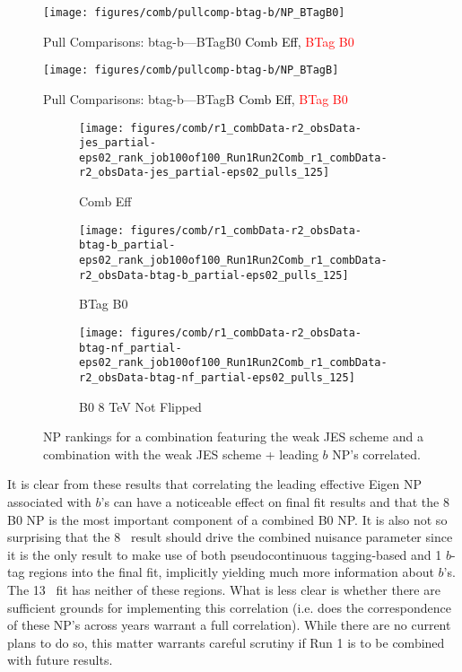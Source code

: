 \begin{figure}[!htbp]\captionsetup{justification=centering}
\centering\texttt{[image: figures/comb/pullcomp-btag-b/NP\_BTagB0]}
  \caption{Pull Comparisons: btag-b---BTagB0  \textcolor{black}{Comb Eff}, \textcolor{red}{BTag B0}}
  \label{fig:PullComparisons:btag-b---BTagB0}
\end{figure}

\begin{figure}[!htbp]\captionsetup{justification=centering}
\centering\texttt{[image: figures/comb/pullcomp-btag-b/NP\_BTagB]}
  \caption{Pull Comparisons: btag-b---BTagB  \textcolor{black}{Comb Eff}, \textcolor{red}{BTag B0}}
  \label{fig:PullComparisons:btag-b---BTagB}
\end{figure}

\begin{figure}[!htbp]\captionsetup{justification=centering}
  \centering
\begin{subfigure}[t]{0.32\linewidth}\centering\texttt{[image: figures/comb/r1\_combData-r2\_obsData-jes\_partial-eps02\_rank\_job100of100\_Run1Run2Comb\_r1\_combData-r2\_obsData-jes\_partial-eps02\_pulls\_125]}\caption{Comb Eff}\end{subfigure}
\begin{subfigure}[t]{0.32\linewidth}\centering\texttt{[image: figures/comb/r1\_combData-r2\_obsData-btag-b\_partial-eps02\_rank\_job100of100\_Run1Run2Comb\_r1\_combData-r2\_obsData-btag-b\_partial-eps02\_pulls\_125]}\caption{BTag B0}\end{subfigure}
\begin{subfigure}[t]{0.32\linewidth}\centering\texttt{[image: figures/comb/r1\_combData-r2\_obsData-btag-nf\_partial-eps02\_rank\_job100of100\_Run1Run2Comb\_r1\_combData-r2\_obsData-btag-nf\_partial-eps02\_pulls\_125]}\caption{B0 8 TeV Not Flipped}\end{subfigure}
  \caption{NP rankings for a combination featuring the weak JES scheme and a combination with the weak JES scheme + leading $b$ NP's correlated.}
    \label{fig:Ranks:btag-b}
\end{figure}

It is clear from these results that correlating the leading effective Eigen NP associated with $b$'s can have a noticeable effect on final fit results and that the 8 \TeV B0 NP is the most important component of a combined B0 NP.  It is also not so surprising that the 8 \tev\, result should drive the combined nuisance parameter since it is the only result to make use of both pseudocontinuous tagging-based and 1 $b$-tag regions into the final fit, implicitly yielding much more information about $b$'s.  The 13 \tev\, fit has neither of these regions.  What is less clear is whether there are sufficient grounds for implementing this correlation (i.e. does the correspondence of these NP's across years warrant a full correlation).  While there are no current plans to do so, this matter warrants careful scrutiny if Run 1 is to be combined with future results.


